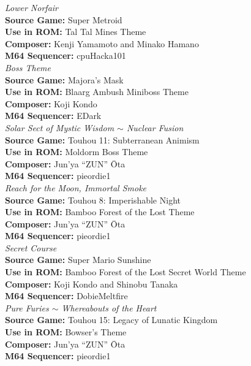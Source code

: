 \documentclass[11pt]{article}
\begin{document}
\break
\textit{\Large Lower Norfair}\\
\textbf{\small Source Game:} Super Metroid\\
\textbf{\small Use in ROM:} Tal Tal Mines Theme\\
\textbf{\small Composer:} Kenji Yamamoto and Minako Hamano\\
\textbf{\small M64 Sequencer:} cpuHacka101\\
\break
\textit{\Large Boss Theme}\\
\textbf{\small Source Game:} Majora's Mask\\
\textbf{\small Use in ROM:} Blaarg Ambush Miniboss Theme\\
\textbf{\small Composer:} Koji Kondo\\
\textbf{\small M64 Sequencer:} EDark\\
\break
\textit{\Large Solar Sect of Mystic Wisdom $\sim$ Nuclear Fusion}\\
\textbf{\small Source Game:} Touhou 11: Subterranean Animism\\
\textbf{\small Use in ROM:} Moldorm Boss Theme\\
\textbf{\small Composer:} Jun'ya ``ZUN'' Ōta\\
\textbf{\small M64 Sequencer:} pieordie1\\
\break
\textit{\Large Reach for the Moon, Immortal Smoke}\\
\textbf{\small Source Game:} Touhou 8: Imperishable Night\\
\textbf{\small Use in ROM:} Bamboo Forest of the Lost Theme\\
\textbf{\small Composer:} Jun'ya ``ZUN'' Ōta\\
\textbf{\small M64 Sequencer:} pieordie1\\
\break
\textit{\Large Secret Course}\\
\textbf{\small Source Game:} Super Mario Sunshine\\
\textbf{\small Use in ROM:} Bamboo Forest of the Lost Secret World Theme\\
\textbf{\small Composer:} 	Koji Kondo and Shinobu Tanaka\\
\textbf{\small M64 Sequencer:} DobieMeltfire\\
\break
\textit{\Large Pure Furies $\sim$ Whereabouts of the Heart}\\
\textbf{\small Source Game:} Touhou 15: Legacy of Lunatic Kingdom\\
\textbf{\small Use in ROM:} Bowser's Theme\\
\textbf{\small Composer:} Jun'ya ``ZUN'' Ōta\\
\textbf{\small M64 Sequencer:} pieordie1\\
\end{document}

